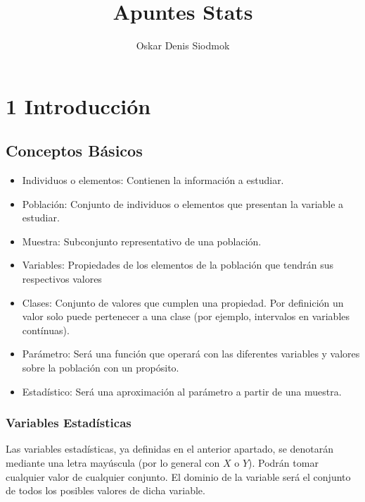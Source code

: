 \documentclass[10pt,a4paper]{book}
\title{Apuntes Stats}
\author{Oskar Denis Siodmok}
\begin{document}
\maketitle

\setcounter{chapter}{1}
\chapter*{\color{blue}\textbf{1} \color{black} Introducción}


\section{Conceptos Básicos}
\begin{itemize}
	\item Individuos o elementos: Contienen la información a estudiar.
	\item Población: Conjunto de individuos o elementos que presentan la variable a estudiar.
	\item Muestra: Subconjunto representativo de una población.
	\item Variables: Propiedades de los elementos de la población que tendrán sus respectivos valores
	\item Clases: Conjunto de valores que cumplen una propiedad. Por definición un valor solo puede pertenecer a una clase (por ejemplo, intervalos en variables contínuas).
	\item Parámetro: Será una función que operará con las diferentes variables y valores sobre la población con un propósito.
	\item Estadístico: Será una aproximación al parámetro a partir de una muestra.
\end{itemize}

\subsection{Variables Estadísticas}
Las variables estadísticas, ya definidas en el anterior apartado, se denotarán mediante una letra mayúscula (por lo general con \(X\) o \(Y\)). Podrán tomar cualquier valor de cualquier conjunto. El dominio de la variable será el conjunto de todos los posibles valores de dicha variable.
\end{document}
